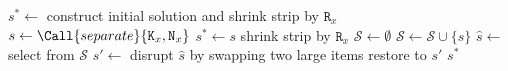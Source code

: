 \begin{algorithm}[ht]
    \begin{algorithmic}[1]
        \State $s^* \gets$ construct initial solution and shrink strip by $\texttt{R}_{x}$
            \State $s \gets \Call{separate}{\texttt{K}_x,\texttt{N}_x}$ 
                \State $s^* \gets s$
                \State shrink strip by $\texttt{R}_{x}$
                \State $\mathcal{S} \gets \emptyset $    
            \Else
                \State $\mathcal{S} \gets \mathcal{S} \cup \{s\}$ 
                \State $\hat{s} \gets$ select from $\mathcal{S}$
                \State $s' \gets$ disrupt $\hat{s}$ by swapping two large items
                \State restore to $s'$   
            \EndIf
        \EndWhile
        \State \Return $s^*$
    \end{algorithmic}
    \caption{\texttt{explore}}
    \label{alg:explore}
\end{algorithm}